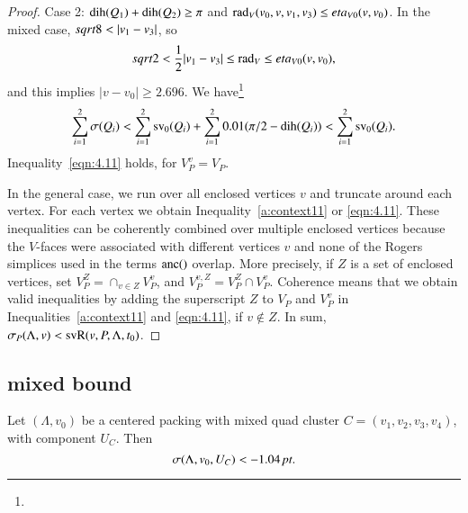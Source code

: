 \begin{proof}
\noindent Case 2:  $\operatorname{dih}(Q_1)+\operatorname{dih}(Q_2)\ge\pi$ and
    $\operatorname{rad}_V(v_0,v,v_1,v_3)\le eta_{V0}(v,v_0)$.
 In the mixed case,
$\sqr8<|v_1-v_3|$, so
$$sqrt2<{\frac{1}{2}}|v_1-v_3|\le\operatorname{rad}_V \le eta_{V0}(v,v_0),$$
and this implies $|v-v_0|\ge 2.696$. We
have\footnote{}
$$\sum_{i=1}^2 \sigma(Q_i) < \sum_{i=1}^2 {\operatorname{sv}}_0(Q_i) +
\sum_{i=1}^2 0.01(\pi/2-\operatorname{dih}(Q_i))< \sum_{i=1}^2 {\operatorname{sv}}_0(Q_i).$$
Inequality~\ref{eqn:4.11} holds, for $V_P^v=V_P$.

In the general case, we run over all enclosed vertices $v$ and
truncate around each vertex.  For each vertex we obtain
Inequality~\ref{a:context11} or \ref{eqn:4.11}. These inequalities can
be coherently combined over multiple enclosed vertices because the
$V$-faces were associated with different vertices $v$ and none of
the Rogers simplices used in the terms $\operatorname{anc}()$ overlap. More
precisely, if $Z$ is a set of enclosed vertices, set $V_P^Z =
\cap_{v\in Z} V_P^v$, and $V_P^{v,Z} = V_P^Z\cap V_P^v$. Coherence
means that we obtain valid inequalities by adding the superscript
$Z$ to $V_P$ and $V_P^v$ in Inequalities~\ref{a:context11} and
\ref{eqn:4.11}, if $v\not\in Z$. In sum,
    $\sigma_P(\Lambda,v) < {\operatorname{svR}}(v,P,\Lambda,t_0)$.
%
\end{proof}



\subsection{mixed bound} %




\begin{lemma}
Let $(\Lambda,v_0)$ be a centered packing with mixed quad cluster
$C=(v_1,v_2,v_3,v_4)$, with component $U_C$.
Then 
   $$
   \sigma(\Lambda,v_0,U_C) < -1.04\,\hbox{\it pt}.
   $$
\end{lemma}

